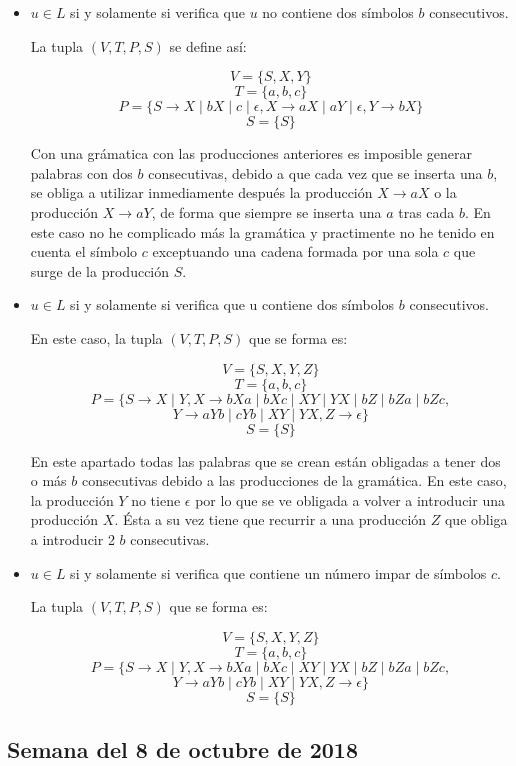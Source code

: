 \documentclass[11pt,a4paper]{article}
\begin{document}
	\begin{itemize}
	\item $u \in L$ si y solamente si verifica que $u$ no contiene dos símbolos $b$ consecutivos.
	
	La tupla $(V,T,P,S)$ se define así:
	
	\[V=\{S,X,Y\}\]
	\[T=\{a,b,c\}\]
	\[P=\{S\rightarrow X\mid bX\mid c\mid \epsilon,X\rightarrow aX\mid aY\mid \epsilon,Y\rightarrow bX\}\]
	\[S=\{S\}\]
	
	Con una grámatica con las producciones anteriores es imposible generar palabras con dos $b$ consecutivas, debido a que cada vez que se inserta una $b$, se obliga a utilizar inmediamente después la producción $X\rightarrow aX$ o la producción $X\rightarrow aY$, de forma que siempre se inserta una $a$ tras cada $b$. En este caso no he complicado más la gramática y practimente no he tenido en cuenta el símbolo $c$ exceptuando una cadena formada por una sola $c$ que surge de la producción $S$.
	
	\item $u \in L$ si y solamente si verifica que u contiene dos símbolos $b$ consecutivos.
	
	En este caso, la tupla $(V,T,P,S)$ que se forma es:
	
	\[V=\{S,X,Y,Z\}\]
	\[T=\{a,b,c\}\]
	\[P=\{S\rightarrow X\mid Y,X\rightarrow bXa\mid bXc\mid XY\mid YX\mid bZ\mid bZa\mid bZc,\]\[Y\rightarrow aYb\mid cYb\mid XY\mid YX,Z\rightarrow \epsilon\}\]
	\[S=\{S\}\]
	
	En este apartado todas las palabras que se crean están obligadas a tener dos o más $b$ consecutivas debido a las producciones de la gramática. En este caso, la producción $Y$ no tiene $\epsilon$ por lo que se ve obligada a volver a introducir una producción $X$. Ésta a su vez tiene que recurrir a una producción $Z$ que obliga a introducir 2 $b$ consecutivas.
	
	\item $u \in L$ si y solamente si verifica que contiene un número impar de símbolos $c$.
	
	La tupla $(V,T,P,S)$ que se forma es:
	
	\[V=\{S,X,Y,Z\}\]
	\[T=\{a,b,c\}\]
	\[P=\{S\rightarrow X\mid Y,X\rightarrow bXa\mid bXc\mid XY\mid YX\mid bZ\mid bZa\mid bZc,\]\[Y\rightarrow aYb\mid cYb\mid XY\mid YX,Z\rightarrow \epsilon\}\]
	\[S=\{S\}\]
	
	\end{itemize}

\subsection{Semana del 8 de octubre de 2018}
\end{document}
